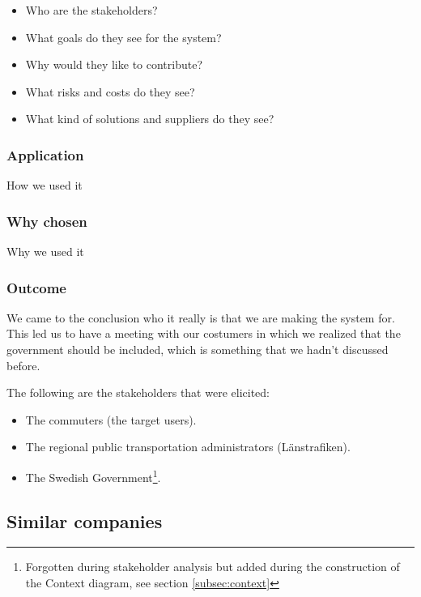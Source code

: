 \documentclass[a4paper]{article}
\begin{document}
    \begin{itemize}
      \item Who are the stakeholders?
      \item What goals do they see for the system?
      \item Why would they like to contribute?
      \item What risks and costs do they see?
      \item What kind of solutions and suppliers do they see?
    \end{itemize}
    
    \subsubsection{Application}
    How we used it
    \subsubsection{Why chosen}
    Why we used it
    \subsubsection{Outcome}
    We came to the conclusion who it really is that we are making the system for. This led us to have a meeting with our costumers in which we realized that the government should be included, which is something that we hadn't discussed before.

    The following are the stakeholders that were elicited:
    \begin{itemize}
      \item The commuters (the target users). 
      \item The regional public transportation administrators (Länstrafiken). 
      \item The Swedish Government\footnote{Forgotten during stakeholder analysis but added during the construction of the Context diagram, see section \ref{subsec:context}}.
    \end{itemize}
    
    
    \subsection{Similar companies}
\end{document}

